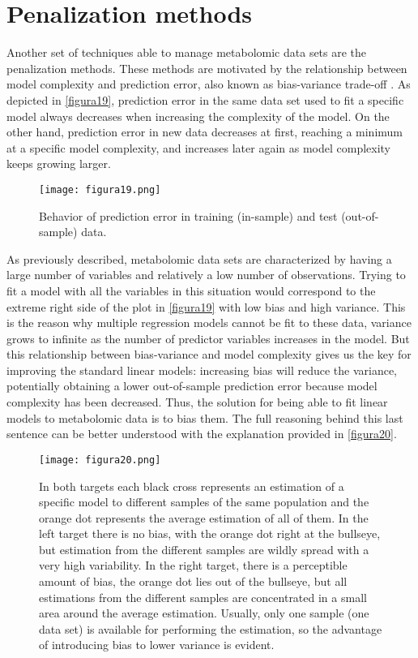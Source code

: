\section{Penalization methods}
\label{penalmethods}
Another set of techniques able to manage metabolomic data sets are the penalization methods. These methods are motivated by the relationship between model complexity and prediction error, also known as bias-variance trade-off \parencite{hastie2001model}. As depicted in \autoref{figura19}, prediction error in the same data set used to fit a specific model always decreases when increasing the complexity of the model. On the other hand, prediction error in new data decreases at first, reaching a minimum at a specific model complexity, and increases later again as model complexity keeps growing larger.

\begin{figure}[hbtp]
	\centering
\texttt{[image: figura19.png]}
\caption{Behavior of prediction error in training (in-sample) and test (out-of-sample) data.}
\label{figura19}
\end{figure}

As previously described, metabolomic data sets are characterized by having a large number of variables and relatively a low number of observations. Trying to fit a model with all the variables in this situation would correspond to the extreme right side of the plot in \autoref{figura19} with low bias and high variance. This is the reason why multiple regression models cannot be fit to these data, variance grows to infinite as the number of predictor variables increases in the model. But this relationship between bias-variance and model complexity gives us the key for improving the standard linear models: increasing bias will reduce the variance, potentially obtaining a lower out-of-sample prediction error because model complexity has been decreased. Thus, the solution for being able to fit linear models to metabolomic data is to bias them. The full reasoning behind this last sentence can be better understood with the explanation provided in \autoref{figura20}.

\begin{figure}[hbtp]
	\centering
\texttt{[image: figura20.png]}
\caption[No bias / high variance vs. Bias / low variance situation]{In both targets each black cross represents an estimation of a specific model to different samples of the same population and the orange dot represents the average estimation of all of them. In the left target there is no bias, with the orange dot right at the bullseye, but estimation from the different samples are wildly spread with a very high variability. In the right target, there is a perceptible amount of bias, the orange dot lies out of the bullseye, but all estimations from the different samples are concentrated in a small area around the average estimation. Usually, only one sample (one data set) is available for performing the estimation, so the advantage of introducing bias to lower variance is evident.}
\label{figura20}
\end{figure}

